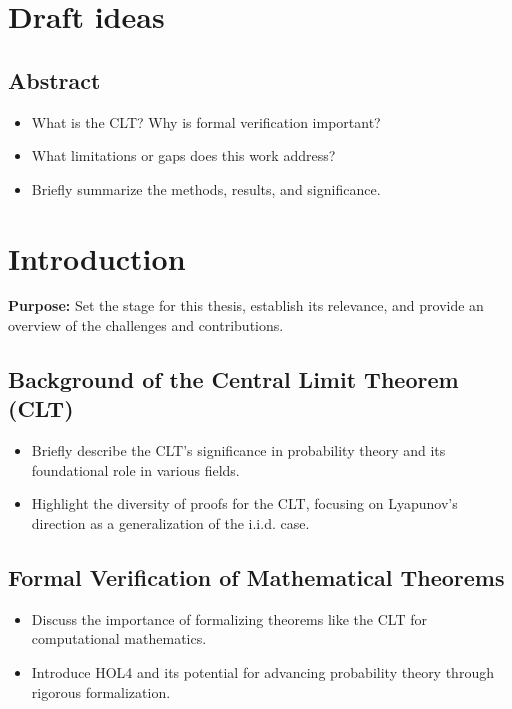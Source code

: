 \section*{Draft ideas}
\subsection{Abstract}
\begin{itemize}
    \item What is the CLT? Why is formal verification important?
    \item What limitations or gaps does this work address?
    \item Briefly summarize the methods, results, and significance.
\end{itemize}
\section{Introduction}
\textbf{Purpose:} Set the stage for this thesis, establish its relevance, and provide an overview of the challenges and contributions.

\subsection{Background of the Central Limit Theorem (CLT)}
\begin{itemize}
    \item Briefly describe the CLT's significance in probability theory and its foundational role in various fields.
    \item Highlight the diversity of proofs for the CLT, focusing on Lyapunov’s direction as a generalization of the i.i.d. case.
\end{itemize}

\subsection{Formal Verification of Mathematical Theorems}   
\begin{itemize}
    \item Discuss the importance of formalizing theorems like the CLT for computational mathematics.
    \item Introduce HOL4 and its potential for advancing probability theory through rigorous formalization.
\end{itemize}

